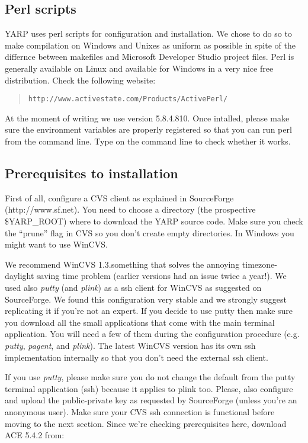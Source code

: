 \subsection{Perl scripts}
\label{sect:perl}

YARP uses perl scripts for configuration and installation. We chose to do so to make compilation on Windows and Unixes as uniform as possible in spite of the differnce between makefiles and Microsoft Developer Studio project files. Perl is generally available on Linux and available for Windows in a very nice free distribution. Check the following website:

\begin{quote}
{\tt http://www.activestate.com/Products/ActivePerl/}
\end{quote}

At the moment of writing we use version 5.8.4.810. Once intalled, please make sure the environment variables are properly registered so that you can run perl from the command line.
Type  on the command line to check whether it works.

\subsection{Prerequisites to installation}

First of all, configure a CVS client as explained in SourceForge (http://www.sf.net).
You need to choose a directory (the prospective \$YARP\_ROOT) where to download the
YARP source code. Make sure you check the ``prune'' flag in CVS so you don't create
empty directories. In Windows you might want to use WinCVS.

We recommend WinCVS 1.3.something that solves the annoying timezone-daylight saving time
problem (earlier versions had an issue twice a year!). We used also {\em putty} (and {\em plink}) as a ssh client for WinCVS as suggested on SourceForge. We found this configuration very stable and we strongly suggest replicating it if you're not an expert. 
If you decide to use putty then make sure you download all the small applications that come with the main terminal application. You will need a few of them during the configuration procedure (e.g. {\em putty}, {\em pagent}, and {\em plink}). The latest WinCVS version has its own ssh implementation internally so that you don't need the external ssh client.

If you use {\em putty}, please make sure you do not change the default from the putty terminal application (ssh)
because it applies to plink too. Please, also configure and upload the public-private key as requested by SourceForge (unless you're an anonymous user). Make sure your CVS ssh connection is functional before moving to the next section. Since we're checking prerequisites here, download ACE 5.4.2 from:

